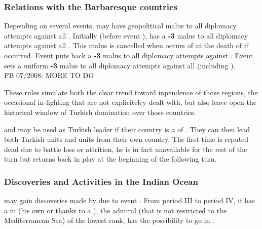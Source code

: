 \subsubsection{Relations with the Barbaresque countries}
\aparag Depending on several events, \TUR may have geopolitical malus to
all diplomacy attempts against all \Barbaresques.
\bparag Initially (before event ), \TUR has a {\bf -3} malus to all diplomacy attempts
against all \Barbaresques.
\bparag This malus is cancelled when  occurs of at the death of  if
 occurred.
\bparag Event  puts back a {\bf -3} malus to all
diplomacy attempts against .
\bparag Event  sets a uniform {\bf -3} malus
to all diplomacy attempts against all \Barbaresques (including
).
\\
PB 07/2008: MORE TO DO
\begin{designnote}
These rules simulate both the clear trend toward inpendence of those regions,
the occasional in-fighting that are not expliciteley dealt with, but also leave
open the historical window of Turkish domination over those countries. 
\end{designnote}

 and  may be used as Turkish leader if
their country is a \VASSAL of \TUR. They can then lead both Turkish
units and units from their own country.
 The first time  is
reputed dead due to battle loss or attrition, he is in fact unavailable
for the rest of the turn but returns back in play at the beginning of
the following turn.

\subsubsection{Discoveries and Activities in the Indian Ocean}
 \TUR may gain discoveries made
by  due to event .
From period III to period IV,  if \TUR has a \TP in   (his own or thanks
to a \dipAT), the admiral (that is not restricted to the Mediterranean Sea)
of the lowest rank, has the possibility to go in .

